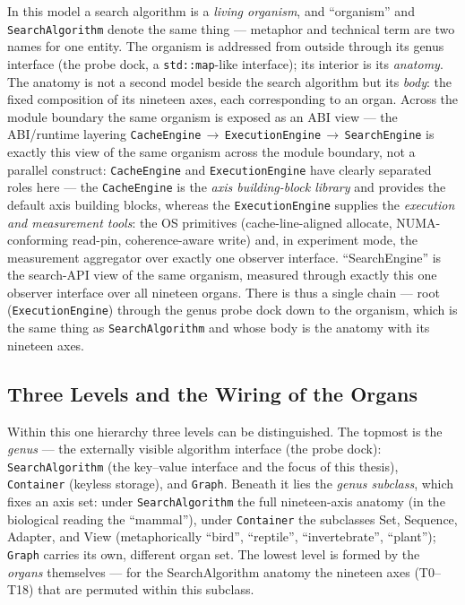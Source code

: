 In this model a search algorithm is a \emph{living organism}, and ``organism'' and
\texttt{SearchAlgorithm} denote the same thing --- metaphor and technical term are two names for
one entity. The organism is addressed from outside through its genus interface (the probe dock, a
\texttt{std::map}-like interface); its interior is its \emph{anatomy}. The anatomy is not a second
model beside the search algorithm but its \emph{body}: the fixed composition of its nineteen axes,
each corresponding to an organ. Across the module boundary the same organism is exposed as an ABI
view --- the ABI/runtime layering
\texttt{CacheEngine}\,$\to$\,\texttt{ExecutionEngine}\,$\to$\,\texttt{SearchEngine} is exactly
this view of the same organism across the module boundary, not a parallel construct:
\texttt{CacheEngine} and \texttt{ExecutionEngine} have clearly separated roles here --- the
\texttt{CacheEngine} is the \emph{axis building-block library} and provides the default axis
building blocks, whereas the \texttt{ExecutionEngine} supplies the
\emph{execution and measurement tools}: the OS primitives (cache-line-aligned allocate,
NUMA-conforming read-pin, coherence-aware write) and, in experiment mode, the measurement
aggregator over exactly one observer interface. ``SearchEngine'' is the search-API view of the
same organism, measured through exactly this one observer interface over all nineteen organs.
There is thus a single chain --- root (\texttt{ExecutionEngine}) through the genus probe dock down
to the organism, which is the same thing as \texttt{SearchAlgorithm} and whose body is the anatomy
with its nineteen axes.

\subsection{Three Levels and the Wiring of the Organs}\label{ssec:three-levels}

Within this one hierarchy three levels can be distinguished. The topmost is the \emph{genus} --- the
externally visible algorithm interface (the probe dock): \texttt{SearchAlgorithm} (the key--value
interface and the focus of this thesis), \texttt{Container} (keyless storage), and \texttt{Graph}.
Beneath it lies the \emph{genus subclass}, which fixes an axis set: under \texttt{SearchAlgorithm}
the full nineteen-axis anatomy (in the biological reading the ``mammal''), under \texttt{Container}
the subclasses Set, Sequence, Adapter, and View (metaphorically ``bird'', ``reptile'', ``invertebrate'',
``plant''); \texttt{Graph} carries its own, different organ set. The lowest level is formed by the
\emph{organs} themselves --- for the SearchAlgorithm anatomy the nineteen axes (T0--T18) that are
permuted within this subclass.


